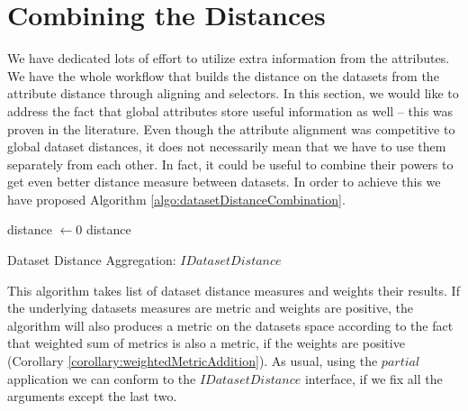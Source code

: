 \section{Combining the Distances}
We have dedicated lots of effort to utilize extra information from the attributes. We have the whole workflow that builds the distance on the datasets from the attribute distance through aligning and selectors. In this section, we would like to address the fact that global attributes store useful information as well -- this was proven in the literature. Even though the attribute alignment was competitive to global dataset distances, it does not necessarily mean that we have to use them separately from each other. In fact, it could be useful to combine their powers to get even better distance measure between datasets. In order to achieve this we have proposed Algorithm \ref{algo:datasetDistanceCombination}.

\IncMargin{1em}
\begin{algorithm}
\BlankLine
distance $\leftarrow 0$\;
\Return distance\;
\caption{Dataset Distance Aggregation: $IDatasetDistance$}\label{algo:datasetDistanceCombination}
\end{algorithm}\DecMargin{1em}

This algorithm takes list of dataset distance measures and weights their results.
If the underlying datasets measures are metric and weights are positive, the algorithm will also produces a metric on the datasets space according to the fact that weighted sum of metrics is also a metric, if the weights are positive (Corollary \ref{corollary:weightedMetricAddition}).
As usual, using the $partial$ application we can conform to the $IDatasetDistance$ interface, if we fix all the arguments except the last two.

